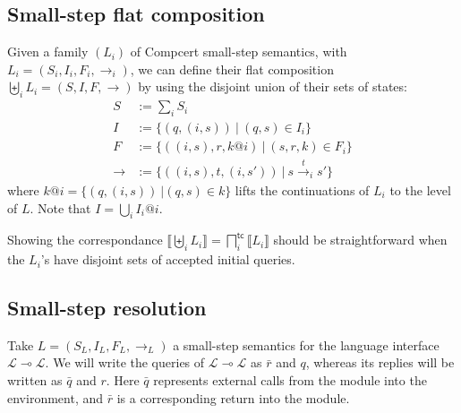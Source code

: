 \documentclass[11pt]{article}
\newcommand{\kw}[1]{{\mathsf{#1}}}
\begin{document}
\subsection{Small-step flat composition}

Given a family $(L_i)$ of Compcert small-step semantics,
with $L_i = (S_i, I_i, F_i, {\rightarrow_i})$,
we can define their flat composition $\biguplus_i L_i = (S, I, F, {\rightarrow})$
by using the disjoint union of their sets of states:
\begin{align*}
  S &:= \sum_i S_i \\
  I &:= \{ (q, (i, s)) \: \vert \: (q, s) \in I_i \} \\
  F &:= \{ ((i, s), r, k@i) \: \vert \: (s, r, k) \in F_i \} \\
  {\rightarrow} &:= \{ ((i, s), t, (i, s')) \: \vert \: s
\stackrel{t}{\rightarrow}_i s' \}
\end{align*}
where $k@i = \{ (q, (i, s)) \: \vert (q, s) \in k \}$
lifts the continuations of $L_i$ to the level of $L$.
Note that $I = \bigcup_i I_i@i$.

Showing the correspondance
$\llbracket \biguplus_i L_i \rrbracket =
 \bigsqcap_i^\kw{tc} \llbracket L_i \rrbracket$
should be straightforward
when the $L_i$'s have disjoint sets of accepted initial queries.

\subsection{Small-step resolution}

Take $L = (S_L, I_L, F_L, {\rightarrow_L})$ a small-step semantics
for the language interface $\mathcal{L} \multimap \mathcal{L}$.
We will write the queries of $\mathcal{L} \multimap \mathcal{L}$
as $\bar{r}$ and $q$,
whereas its replies will be written
as $\bar{q}$ and $r$.
Here $\bar{q}$ represents external calls from the module into the environment,
and $\bar{r}$ is a corresponding return into the module.
\end{document}
